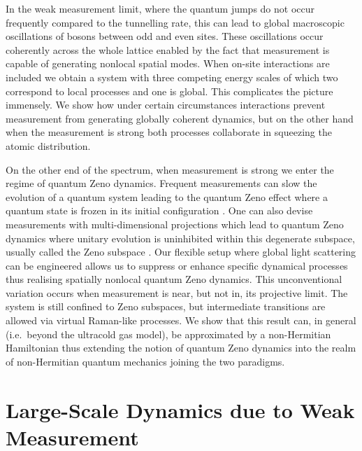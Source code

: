 In the weak measurement limit, where the quantum jumps do not occur
frequently compared to the tunnelling rate, this can lead to global
macroscopic oscillations of bosons between odd and even sites. These
oscillations occur coherently across the whole lattice enabled by the
fact that measurement is capable of generating nonlocal spatial
modes. When on-site interactions are included we obtain a system with
three competing energy scales of which two correspond to local
processes and one is global. This complicates the picture
immensely. We show how under certain circumstances interactions
prevent measurement from generating globally coherent dynamics, but on
the other hand when the measurement is strong both processes
collaborate in squeezing the atomic distribution.

On the other end of the spectrum, when measurement is strong we enter
the regime of quantum Zeno dynamics. Frequent measurements can slow
the evolution of a quantum system leading to the quantum Zeno effect
where a quantum state is frozen in its initial configuration
\cite{misra1977, facchi2008}. One can also devise measurements with
multi-dimensional projections which lead to quantum Zeno dynamics
where unitary evolution is uninhibited within this degenerate
subspace, usually called the Zeno subspace \cite{facchi2008,
  raimond2010, raimond2012, signoles2014}. Our flexible setup where global light
scattering can be engineered allows us to suppress or enhance specific
dynamical processes thus realising spatially nonlocal quantum Zeno
dynamics. This unconventional variation occurs when measurement is
near, but not in, its projective limit. The system is still confined
to Zeno subspaces, but intermediate transitions are allowed via
virtual Raman-like processes. We show that this result can, in general
(i.e.~beyond the ultracold gas model), be approximated by a
non-Hermitian Hamiltonian thus extending the notion of quantum Zeno
dynamics into the realm of non-Hermitian quantum mechanics joining the
two paradigms.

\section{Large-Scale Dynamics due to Weak Measurement}

